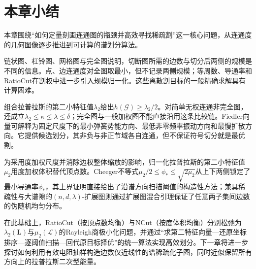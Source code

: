 \section{本章小结}
\label{sec:graph-spectral-partition-summary}

本章围绕“如何定量刻画连通图的瓶颈并高效寻找稀疏割”这一核心问题，从连通度的几何图像逐步推进到可计算的谱划分算法。

链状图、杠铃图、网格图与完全图说明，切断图所需的边数与切分后两侧的规模是不同的信息。点、边连通度对全图取最小，但不记录两侧规模；等周数、导通率和RatioCut在割权中进一步引入规模归一化。这些离散割目标的一般精确求解具有计算困难。

组合拉普拉斯的第二小特征值$\lambda_2$给出$h(\mathcal G)\geq\lambda_2/2$。对简单无权连通非完全图，还成立$\lambda_2\leq\kappa\leq\lambda\leq\delta$；完全图与一般加权图不能直接沿用这条比较链。Fiedler向量可解释为固定尺度下的最小弹簧势能方向、最低非零频率振动方向和最慢扩散方向。它提供候选划分，其非负与非正节域各自连通，但不保证符号切分就是最优割。

为采用度加权尺度并消除边权整体缩放的影响，归一化拉普拉斯的第二小特征值$\mu_2$用度加权体积替代顶点数。Cheeger不等式$\mu_2/2\leq\phi_*\leq\sqrt{2\mu_2}$从上下两侧锁定了最小导通率$\phi_*$，其上界证明直接给出了沿谱方向扫描阈值的构造性方法；兼具稀疏性与大谱隙的$(n,d,\lambda)$-扩展图则通过扩展图混合引理保证了任意两子集间边数的伪随机均匀分布。

在此基础上，RatioCut（按顶点数均衡）与NCut（按度体积均衡）分别松弛为$\lambda_2(\bm L)$与$\mu_2(\mathcal L)$的Rayleigh商极小化问题，并通过“求第二特征向量—还原坐标排序—逐阈值扫描—回代原目标择优”的统一算法实现高效划分。下一章将进一步探讨如何利用有效电阻抽样构造边数仅近线性的谱稀疏化子图，同时近似保留所有方向上的拉普拉斯二次型能量。
